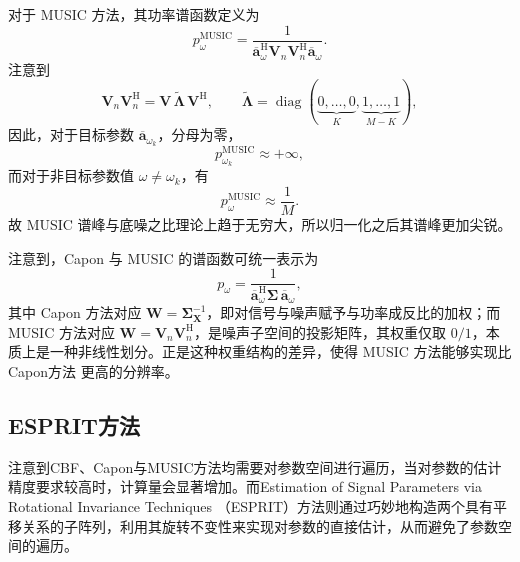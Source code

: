 对于 MUSIC 方法，其功率谱函数定义为
\[
    p_{\omega}^{\text{MUSIC}}
    = \frac{1}{\overline{\bm{a}}_{\omega}^{\mathrm{H}}
    \mathbf{V}_n \mathbf{V}_n^{\mathrm{H}}
    \overline{\bm{a}}_{\omega}}.
\]
注意到
\[
    \mathbf{V}_n \mathbf{V}_n^{\mathrm{H}}
    = \mathbf{V}\,\tilde{\mathbf{\Lambda}}\,\mathbf{V}^{\mathrm{H}}, \qquad
    \tilde{\mathbf{\Lambda}}
    = \operatorname{diag}(\underbrace{0,\dots,0}_{K},
    \underbrace{1,\dots,1}_{M-K}),
\]
因此，对于目标参数 \(\overline{\bm{a}}_{\omega_k}\)，分母为零，
\[
    p_{\omega_k}^{\text{MUSIC}} \approx +\infty,
\]
而对于非目标参数值 \(\omega \neq \omega_k\)，有
\[
    p_{\omega}^{\text{MUSIC}} \approx \frac{1}{M}.
\]
故 MUSIC 谱峰与底噪之比理论上趋于无穷大，所以归一化之后其谱峰更加尖锐。

注意到，Capon 与 MUSIC 的谱函数可统一表示为
\[
    p_{\omega} = \frac{1}{\overline{\bm{a}}_{\omega}^{\mathrm{H}}
        \mathbf{\Sigma}\,\overline{\bm{a}}_{\omega}},
\]
其中 Capon 方法对应 \(\mathbf{W} = \mathbf{\Sigma}_{\mathbf{X}}^{-1}\)，即对信号与噪声赋予与功率成反比的加权；而 MUSIC 方法对应 \(\mathbf{W} = \mathbf{V}_n \mathbf{V}_n^{\mathrm{H}}\)，是噪声子空间的投影矩阵，其权重仅取 \(0/1\)，本质上是一种非线性划分。正是这种权重结构的差异，使得 MUSIC 方法能够实现比 Capon方法 更高的分辨率。

\subsection{ESPRIT方法}
注意到CBF、Capon与MUSIC方法均需要对参数空间进行遍历，当对参数的估计精度要求较高时，计算量会显著增加。而Estimation of Signal Parameters via Rotational Invariance Techniques （ESPRIT）方法则通过巧妙地构造两个具有平移关系的子阵列，利用其旋转不变性来实现对参数的直接估计，从而避免了参数空间的遍历。

